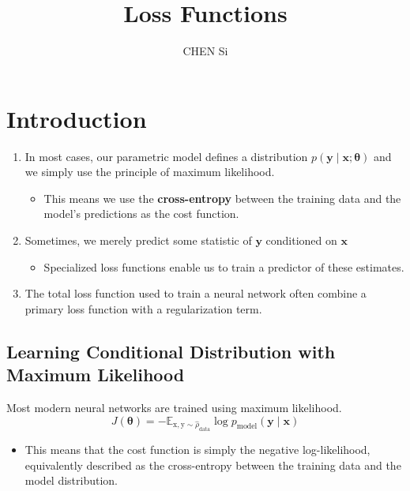 \documentclass[12pt, a4paper]{article}
\title{Loss Functions}
\author{CHEN Si}
\date{}
\def\vx{\boldsymbol{x}}
\def\vy{\boldsymbol{y}}
\def\vtheta{\boldsymbol{\theta}}
\def\vrmx{\boldsymbol{\mathrm{x}}}
\def\vrmy{\boldsymbol{\mathrm{y}}}
\newcommand{\condip}[3]{p(#1 \mid #2;#3)}
\begin{document}
 


\maketitle
\tableofcontents


\section{Introduction}
\begin{enumerate}
    \item In most cases, our parametric model defines a distribution $\condip{\vy}{\vx}{\vtheta}$ and we simply use the principle of maximum likelihood.
        \begin{itemize}
            \item This means we use the \textbf{cross-entropy} between the training data and the model's predictions as the cost function.
        \end{itemize}
    \item Sometimes, we merely predict some statistic of $\vy$ conditioned on $\vx$
        \begin{itemize}
            \item Specialized loss functions enable us to train a predictor of these estimates.
        \end{itemize}
    \item The total loss function used to train a neural network often combine a primary loss function with a regularization term.
\end{enumerate}


\subsection{Learning Conditional Distribution with Maximum Likelihood}
Most modern neural networks are trained using maximum likelihood.
\[
    J(\vtheta) = - \mathbb{E}_{\vrmx,\vrmy\sim\hat{\rho}_\text{data}} \log p_\text{model}(\vy \mid \vx)
\]
\begin{itemize}
    \item This means that the cost function is simply the negative log-likelihood, equivalently described as the cross-entropy between the training data and the model distribution.
\end{itemize}
\end{document}
